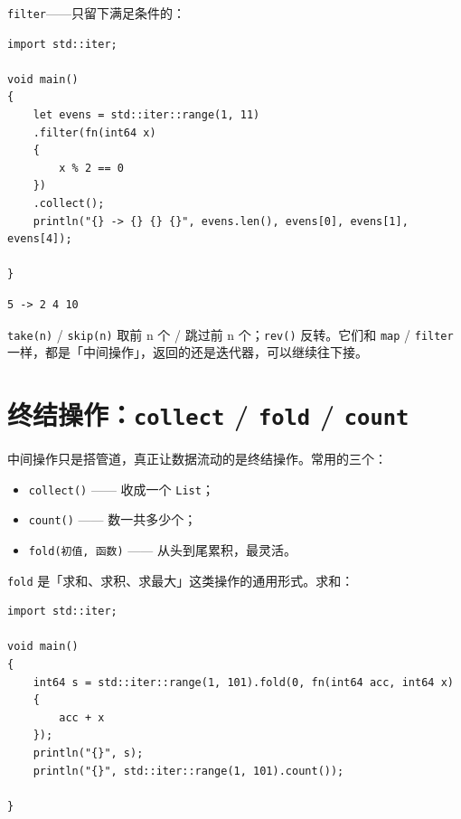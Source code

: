 \texttt{filter}——只留下满足条件的：

\par
\medskip
\begin{lstlisting}[style=chali]
import std::iter;

void main()
{
    let evens = std::iter::range(1, 11)
    .filter(fn(int64 x)
    {
        x % 2 == 0
    })
    .collect();
    println("{} -> {} {} {}", evens.len(), evens[0], evens[1], evens[4]);

}
\end{lstlisting}
\par
\medskip

\par
\medskip
\begin{lstlisting}[style=out]
5 -> 2 4 10
\end{lstlisting}
\par
\medskip

\texttt{take(\allowbreak{}n)\allowbreak{}} / \texttt{skip(\allowbreak{}n)\allowbreak{}} 取前 n 个 / 跳过前 n 个；\texttt{rev(\allowbreak{})\allowbreak{}} 反转。它们和 \texttt{map} / \texttt{filter} 一样，都是「中间操作」，返回的还是迭代器，可以继续往下接。

\section{终结操作：\texttt{collect} / \texttt{fold} / \texttt{count}}

中间操作只是搭管道，真正让数据流动的是终结操作。常用的三个：

\begin{itemize}

\item \texttt{collect(\allowbreak{})\allowbreak{}} —— 收成一个 \texttt{List}；

\item \texttt{count(\allowbreak{})\allowbreak{}} —— 数一共多少个；

\item \texttt{fold(\allowbreak{}初值,\allowbreak{} 函数)\allowbreak{}} —— 从头到尾累积，最灵活。

\end{itemize}

\texttt{fold} 是「求和、求积、求最大」这类操作的通用形式。求和：

\par
\medskip
\begin{lstlisting}[style=chali]
import std::iter;

void main()
{
    int64 s = std::iter::range(1, 101).fold(0, fn(int64 acc, int64 x)
    {
        acc + x
    });
    println("{}", s);
    println("{}", std::iter::range(1, 101).count());

}
\end{lstlisting}
\par
\medskip

